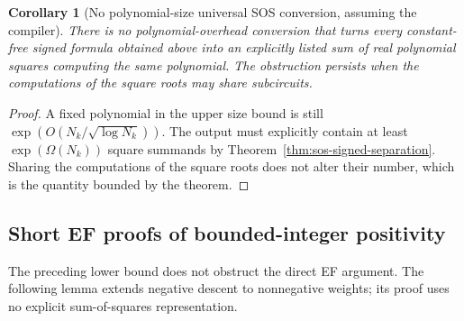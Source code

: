 \documentclass[11pt]{article}
\newtheorem{corollary}[theorem]{Corollary}
\theoremstyle{definition}
\theoremstyle{remark}
\begin{document}
\begin{corollary}[No polynomial-size universal SOS conversion, assuming the compiler]
\label{cor:sos-no-conversion}
There is no polynomial-overhead conversion that turns every
constant-free signed formula obtained above into an explicitly listed
sum of real polynomial squares computing the same polynomial.
The obstruction persists when the computations of the square roots
may share subcircuits.
\end{corollary}
\begin{proof}
A fixed polynomial in the upper size bound is still
$\exp(O(N_k/\sqrt{\log N_k}))$.
The output must explicitly contain at least
$\exp(\Omega(N_k))$ square summands by
Theorem~\ref{thm:sos-signed-separation}.
Sharing the computations of the square roots does not alter their
number, which is the quantity bounded by the theorem.
\end{proof}

\subsection{Short EF proofs of bounded-integer positivity}

The preceding lower bound does not obstruct the direct EF argument.
The following lemma extends negative descent to nonnegative weights;
its proof uses no explicit sum-of-squares representation.
\end{document}
